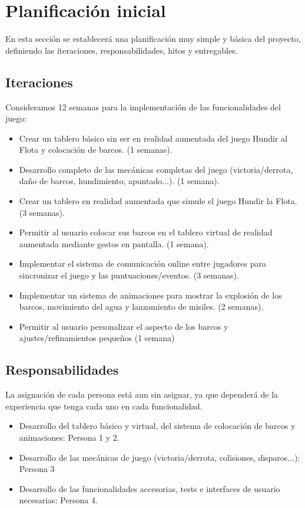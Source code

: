 \documentclass[a4paper, openright, 12pt]{article}
\begin{document}
\section{Planificación inicial}
En esta sección se establecerá una planificación muy simple y básica del proyecto, definiendo las iteraciones, responsabilidades, hitos y entregables.
\subsection{Iteraciones}
Consideramos 12 semanas para la implementación de las funcionalidades del juego:
\begin{itemize}
    \item Crear un tablero básico sin ser en realidad aumentada del juego Hundir al Flota y colocación de barcos. (1 semanas).
    \item Desarrollo completo de las mecánicas completas del juego (victoria/derrota, daño de barcos, hundimiento, apuntado...). (1 semana).
    \item Crear un tablero en realidad aumentada que simule el juego Hundir la Flota. (3 semanas).
    \item Permitir al usuario colocar sus barcos en el tablero virtual de realidad aumentada mediante gestos en pantalla. (1 semana).
    \item Implementar el sistema de comunicación online entre jugadores para sincronizar el juego y las puntuaciones/eventos. (3 semanas).
    \item Implementar un sistema de animaciones para mostrar la explosión de los barcos, movimiento del agua y lanzamiento de misiles. (2 semanas).
    \item Permitir al usuario personalizar el aspecto de los barcos y ajustes/refinamientos pequeños (1 semana)
\end{itemize}
\subsection{Responsabilidades}
La asignación de cada persona está aun sin asignar, ya que dependerá de la experiencia que tenga cada uno en cada funcionalidad.
\begin{itemize}
    \item Desarrollo del tablero básico y virtual, del sistema de colocación de barcos y animaciones: Persona 1 y 2.
    \item Desarrollo de las mecánicas de juego (victoria/derrota, colisiones, disparos...): Persona 3
    \item Desarrollo de las funcionalidades accesorias, tests e interfaces de usuario necesarias: Persona 4.
\end{itemize}
\end{document}
